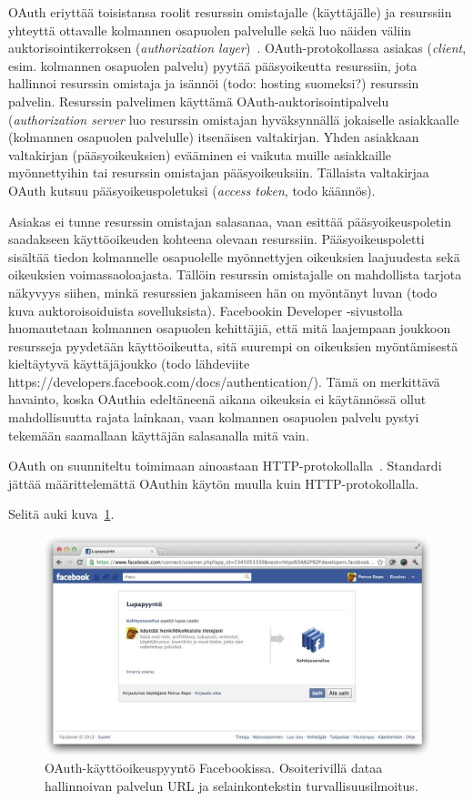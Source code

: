 \documentclass[finnish,gradu]{tktltiki}
\begin{document}
  OAuth eriyttää toisistansa roolit resurssin omistajalle (käyttäjälle) ja resurssiin yhteyttä ottavalle kolmannen osapuolen palvelulle sekä luo näiden väliin auktorisointikerroksen (\emph{authorization layer})~\cite{ietf_oauth2}. OAuth-protokollassa asiakas (\emph{client}, esim. kolmannen osapuolen palvelu) pyytää pääsyoikeutta resurssiin, jota hallinnoi resurssin omistaja ja isännöi (todo: hosting suomeksi?) resurssin palvelin. Resurssin palvelimen käyttämä OAuth-auktorisointipalvelu (\emph{authorization server} luo resurssin omistajan hyväksynnällä jokaiselle asiakkaalle (kolmannen osapuolen palvelulle) itsenäisen valtakirjan. Yhden asiakkaan valtakirjan (pääsyoikeuksien) evääminen ei vaikuta muille asiakkaille myönnettyihin tai resurssin omistajan pääsyoikeuksiin. Tällaista valtakirjaa OAuth kutsuu pääsyoikeuspoletuksi (\emph{access token}, todo käännös).

  Asiakas ei tunne resurssin omistajan salasanaa, vaan esittää pääsyoikeuspoletin saadakseen käyttöoikeuden kohteena olevaan resurssiin. Pääsyoikeuspoletti sisältää tiedon kolmannelle osapuolelle myönnettyjen oikeuksien laajuudesta sekä oikeuksien voimassaoloajasta. Tällöin resurssin omistajalle on mahdollista tarjota näkyvyys siihen, minkä resurssien jakamiseen hän on myöntänyt luvan (todo kuva auktoroisoiduista sovelluksista). Facebookin Developer -sivustolla huomautetaan kolmannen osapuolen kehittäjiä, että mitä laajempaan joukkoon resursseja pyydetään käyttöoikeutta, sitä suurempi on oikeuksien myöntämisestä kieltäytyvä käyttäjäjoukko (todo lähdeviite https://developers.facebook.com/docs/authentication/). Tämä on merkittävä havainto, koska OAuthia edeltäneenä aikana oikeuksia ei käytännössä ollut mahdollisuutta rajata lainkaan, vaan kolmannen osapuolen palvelu pystyi tekemään saamallaan käyttäjän salasanalla mitä vain.

  OAuth on suunniteltu toimimaan ainoastaan HTTP-protokollalla~\cite{ietf_oauth2}.
  Standardi jättää määrittelemättä OAuthin käytön muulla kuin HTTP-protokollalla.


  Selitä auki kuva~\ref{fig:facebook_oauth_lupapyynto}.

  \begin{figure}
    \centering
    \includegraphics[width=1.0\textwidth]{images/facebook_oauth_lupapyynto.jpg}
    \caption{OAuth-käyttöoikeuspyyntö Facebookissa. Osoiterivillä dataa hallinnoivan palvelun URL ja selainkontekstin turvallisuusilmoitus.}
    \label{fig:facebook_oauth_lupapyynto}
  \end{figure}
\end{document}
